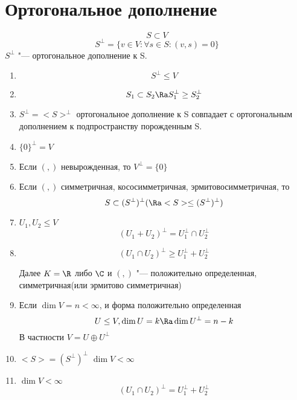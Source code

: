 ﻿\section{Ортогональное дополнение}
\begin{Def}
    $$S \subset V$$
    $$S^{\bot} = \{v \in V \colon \forall s \in S \colon (v, s) = 0\}$$
    $S^{\bot}$ "--- ортогональное дополнение к S.
\end{Def}

\begin{conseq}
    \begin{enumerate}
    \item $$S^{\bot} \le V$$
    \item $$S_1 \subset S_2 \Ra S_1^{\bot} \ge S_2^{\bot}$$
    \item $S^{\bot} = <S>^{\bot}$ ортогональное дополнение к S совпадает 
    с ортогональным дополнением к подпространству порожденным S.
    \item $\{0\}^{\bot} = V$
    \item Если $(,)$ невырожденная, то $V^{\bot} = \{0\}$
    \item Если $(,)$ симметричная, кососимметричная, эрмитовосимметричная, то 
    $$S \subset (S^{\bot})^{\bot} (\Ra <S> \le (S^{\bot})^{\bot})$$
    \item $U_1, U_2 \le V$
    $$(U_1 + U_2)^{\bot} = U_1^{\bot} \cap U_2^{\bot}$$
    \item $$(U_1 \cap U_2)^{\bot} \ge U_1^{\bot} + U_2^{\bot}$$
    
    \begin{Rem}
    Далее $K = \R$ либо $\C$ и $(,)$ "--- положительно определенная, симметричная(или эрмитово симметричная)
    \end{Rem}
    \item Если $\dim V = n < \infty$, и форма положительно определенная 
    $$U \le V, \dim U = k \Ra \dim U^{\bot} = n - k$$
    В частности $V = U \oplus U^{\bot}$
    \item $<S> = (S^{\bot})^{\bot}$
    $\dim V < \infty$

    \item $\dim V < \infty$
    $$(U_1 \cap U_2)^{\bot} = U_1^{\bot} + U_2^{\bot}$$
    \end{enumerate}
\end{conseq}
